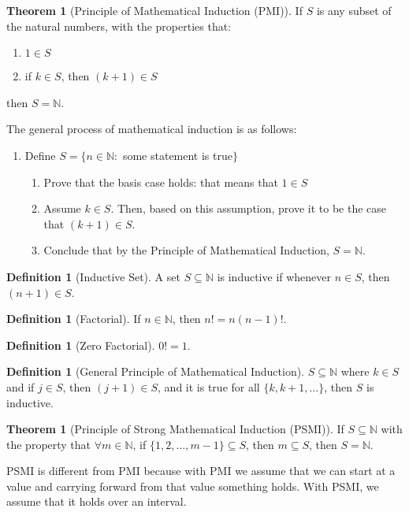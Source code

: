 \documentclass[10pt]{article}
\theoremstyle{definition}
\newtheorem{definition}[equation]{Definition}
\newtheorem{theorem}[equation]{Theorem}
\newcommand{\N}{\mathbb{N}}
\begin{document}
\begin{theorem}[Principle of Mathematical Induction (PMI)]
  If $S$ is any subset of the natural numbers, with the properties that:
  \begin{enumerate}
    \item $1\in S$
    \item if $k\in S$, then $(k+1)\in S$
  \end{enumerate}
  then $S=\N$.

  The general process of mathematical induction is as follows:
  \begin{enumerate}
    \item Define $S=\{n\in\N:$ some statement is true$\}$
    \begin{enumerate}
      \item Prove that the basis case holds: that means that $1\in S$
      \item Assume $k\in S$. Then, based on this assumption, prove it to be the case that $(k+1)\in S$.
      \item Conclude that by the Principle of Mathematical Induction, $S=\N$.
    \end{enumerate}
  \end{enumerate}
\end{theorem}

\begin{definition}[Inductive Set]
  A set $S\subseteq\N$ is inductive if whenever $n\in S$, then $(n+1)\in S$.
\end{definition}

\begin{definition}[Factorial]
  If $n\in\N$, then $n! = n(n-1)!$.
\end{definition}

\begin{definition}[Zero Factorial]
  $0! = 1$.
\end{definition}

\begin{definition}[General Principle of Mathematical Induction]
  $S\subseteq\N$ where $k\in S$ and if $j\in S$, then $(j+1)\in S$, and it is true for all $\{k, k+1, \dots \}$, then $S$ is inductive.
\end{definition}

\begin{theorem}[Principle of Strong Mathematical Induction (PSMI)]
    If $S\subseteq\N$ with the property that $\forall m\in\N$, if $\{1,2,\dots,m-1\}\subseteq S$, then $m\subseteq S$, then $S=\N$.

    PSMI is different from PMI because with PMI we assume that we can start at a value and carrying forward from that value something holds. With PSMI, we assume that it holds over an interval.
\end{theorem}
\end{document}
